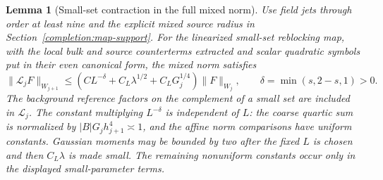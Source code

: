 \documentclass[11pt]{article}
\newtheorem{lemma}[proposition]{Lemma}
\begin{document}
\begin{lemma}[Small-set contraction in the full mixed norm]
\label{completion:smallset}
Use field jets through order at least nine and the explicit mixed source
radius in Section~\ref{completion:map-support}. For the linearized
small-set reblocking map, with the local bulk and source counterterms
extracted and scalar quadratic symbols put in their even canonical
form, the mixed norm satisfies
\[
 \|\mathcal L_jF\|_{W_{j+1}}
 \le \left(CL^{-\delta}+C_L\lambda^{1/2}
                         +C_LG_j^{1/4}\right)\|F\|_{W_j},
 \qquad \delta=\min(s,2-s,1)>0.
\]
The background reference factors on the complement of a small set are
included in \(\mathcal L_j\). The constant multiplying \(L^{-\delta}\)
is independent of \(L\): the coarse quartic sum is normalized by
\(|B|G_jh_{j+1}^4\asymp1\), and the affine norm comparisons have uniform
constants. Gaussian moments may be bounded by two after the fixed
\(L\) is chosen and then \(C_L\lambda\) is made small. The remaining
nonuniform constants occur only in the displayed small-parameter terms.
\end{lemma}
\end{document}
